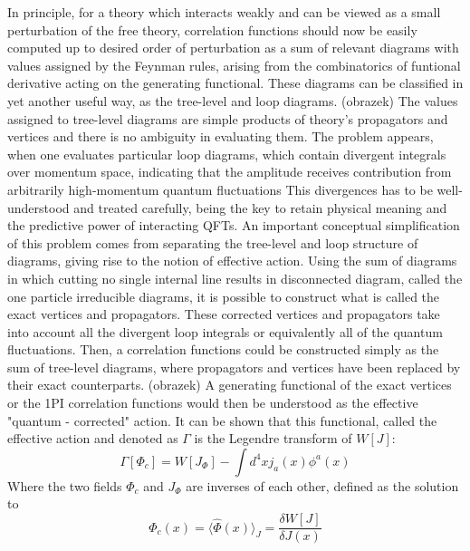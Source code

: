 \documentclass[11pt, a4paper]{article}
\begin{document}
In principle, for a theory which interacts weakly and can be viewed as a small perturbation of the free theory, correlation functions should now be easily computed up to desired order of perturbation as a sum of relevant diagrams with values assigned by the Feynman rules, arising from the combinatorics of funtional derivative acting on the generating functional.
These diagrams can be classified in yet another useful way,
as the tree-level and loop diagrams.
(obrazek)
The values assigned to tree-level diagrams are simple products of theory's propagators and vertices and there is no ambiguity in evaluating them.
The problem appears, when one evaluates particular loop diagrams, which contain divergent integrals over momentum space, indicating that the amplitude receives contribution from arbitrarily high-momentum quantum fluctuations
This divergences has to be well-understood and treated carefully, being the key to retain physical meaning and the predictive power of interacting QFTs.
An important conceptual simplification of this problem comes from separating the tree-level and loop structure of diagrams, giving rise to the notion of effective action.
Using the sum of diagrams in which cutting no single internal line results in disconnected diagram, called the one particle irreducible diagrams, it is possible to construct what is called the exact vertices and propagators.
These corrected vertices and propagators take into account all the divergent loop integrals or equivalently all of the quantum fluctuations.
Then, a correlation functions could be constructed simply as the sum of tree-level diagrams, where propagators and vertices have been replaced by their exact counterparts.
(obrazek)
A generating functional of the exact vertices or the 1PI correlation functions would then be understood as the effective "quantum - corrected" action.
It can be shown that this functional, called the effective action and denoted as $\Gamma$ is the Legendre transform of $W[J]$:
\begin{equation}
    \Gamma[\Phi_c] = W[J_\Phi] - \int d^4 x j_a (x) \phi^a(x)
\end{equation}
Where the two fields $\Phi_c$ and $J_\Phi$ are inverses of each other, defined as the solution to
\begin{equation}
    \Phi_c(x) = \langle \hat\Phi (x) \rangle_{J} = \frac{\delta W[J]}{\delta J(x)}
\end{equation}
\end{document}
